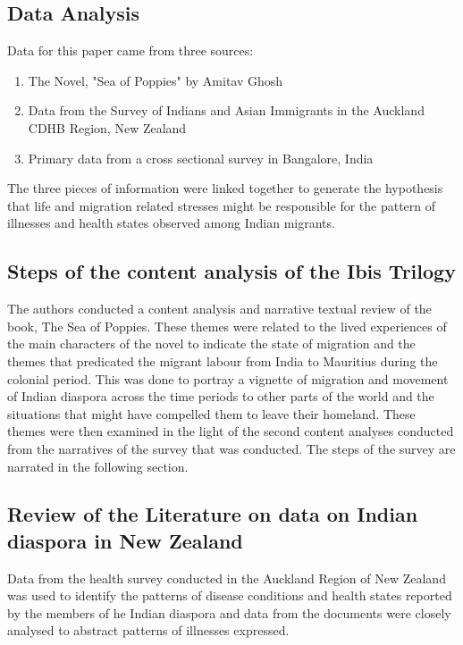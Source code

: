 \subsection*{Data Analysis}

Data for this paper came from three sources:

\begin{enumerate}
\item The Novel, "Sea of Poppies" by Amitav Ghosh
\item Data from the Survey of Indians and Asian Immigrants in the Auckland CDHB Region, New Zealand
\item Primary data from a cross sectional survey in Bangalore, India
\end{enumerate}

The three pieces of information were linked together to generate the hypothesis that life and migration related stresses might be responsible for the pattern of illnesses and health states observed among Indian migrants.

\subsection*{Steps of the content analysis of the Ibis Trilogy}

The authors conducted a content analysis and narrative textual review of the book, The Sea of Poppies. These themes were related to the lived experiences of the main characters of the novel to indicate the state of migration and the themes that predicated the migrant labour from India to  Mauritius during the colonial period. This was done to portray a vignette of migration and movement of Indian diaspora across the time periods to other parts of the world and the situations that might have compelled them to leave their homeland. These themes were then examined in the light of the second content analyses conducted from the narratives of the survey that was conducted. The steps of the survey are narrated in the following section.

\subsection*{Review of the Literature on data on Indian diaspora in New Zealand}

Data from the health survey conducted in the Auckland Region of New Zealand was used to identify the patterns of disease conditions and health states reported by the members of he Indian diaspora and data from the documents were closely analysed to abstract patterns of illnesses expressed. 

